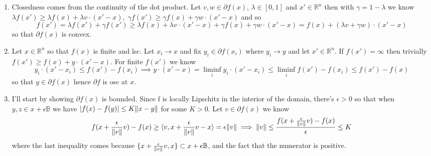 \documentclass{article}
\newenvironment{ex}[1]
  {\renewcommand\theexercise{#1}\exercise}
  {\endexercise}
\newcommand{\B}{\mathbb{B}}
\newcommand{\R}[1]{\mathbb{R}^{#1}}
\begin{document}
\begin{ex}{7.20} %
  \begin{enumerate}[label=(\alph*)] \, \\
    \newcommand{\xb}{\overline{x}}
    \newcommand{\pp}[2]{P_{#1}\parens{#2}}
    \item
      Closedness comes from the continuity of the dot product. Let $v, w \in \partial f(x), \, \lambda \in [0, 1]$ and $x' \in \R{n}$ then with $\gamma = 1-\lambda$ we know $\lambda f(x') \ge \lambda f(x) + \lambda v \cdot (x' - x), \; \gamma f(x') \ge \gamma f(x) + \gamma w \cdot (x' - x)$ and so
      $$
      f(x') = \lambda f(x') + \gamma f(x') \ge \lambda f(x) + \lambda v \cdot (x' - x) + \gamma f(x) + \gamma w \cdot (x' - x) = f(x) + (\lambda v + \gamma w) \cdot (x' - x)
      $$
      so that $\partial f(x)$ is convex.
    \item
      Let $x \in \R{n}$ so that $f(x)$ is finite and lsc. Let $x_i \to x$ and fix $y_i \in \partial f(x_i)$ where $y_i \to y$ and let $x' \in \R{n}$. If $f(x') = \infty$ then trivially $f(x') \ge f(x) + y \cdot (x'-x)$. For finite $f(x')$ we know
      $$
      y_i \cdot (x' - x_i) \le f(x') - f(x_i) \implies y \cdot (x' - x) = \liminf_i y_i \cdot (x' - x_i) \le \liminf_i f(x') - f(x_i) \le f(x') - f(x)
      $$
      so that $y \in \partial f(x)$ hence $\partial f$ is osc at $x$.
    \item
      I'll start by showing $\partial f(x)$ is bounded. Since f is locally Lipschitz in the interior of the domain, there's $\epsilon > 0$ so that when $y, z \in x + \epsilon \B$ we have $\lvert f(x) - f(y)\rvert \le K \lVert x - y\rVert$ for some $K > 0$. Let $v \in \partial f(x)$ we know
      $$
      f(x+\frac{\epsilon}{\lVert v\rVert}v) - f(x) \ge \langle v, x+\frac{\epsilon}{\lVert v\rVert}v - x\rangle = \epsilon \lVert v\rVert \implies \lVert v\rVert \le \frac{f(x+\frac{\epsilon}{\lVert v\rVert}v) - f(x)}{\epsilon} \le K
      $$
      where the last inequality comes because $\braces{x+\frac{\epsilon}{\norm{v}}v, x} \subset x + \epsilon \B$, and the fact that the numerator is positive. \, \\


\end{enumerate}
\end{ex}
\end{document}
